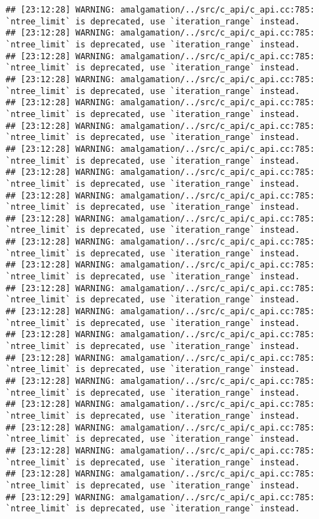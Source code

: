 \documentclass[
]{article}
\begin{document}
\begin{verbatim}
## [23:12:28] WARNING: amalgamation/../src/c_api/c_api.cc:785: `ntree_limit` is deprecated, use `iteration_range` instead.
## [23:12:28] WARNING: amalgamation/../src/c_api/c_api.cc:785: `ntree_limit` is deprecated, use `iteration_range` instead.
## [23:12:28] WARNING: amalgamation/../src/c_api/c_api.cc:785: `ntree_limit` is deprecated, use `iteration_range` instead.
## [23:12:28] WARNING: amalgamation/../src/c_api/c_api.cc:785: `ntree_limit` is deprecated, use `iteration_range` instead.
## [23:12:28] WARNING: amalgamation/../src/c_api/c_api.cc:785: `ntree_limit` is deprecated, use `iteration_range` instead.
## [23:12:28] WARNING: amalgamation/../src/c_api/c_api.cc:785: `ntree_limit` is deprecated, use `iteration_range` instead.
## [23:12:28] WARNING: amalgamation/../src/c_api/c_api.cc:785: `ntree_limit` is deprecated, use `iteration_range` instead.
## [23:12:28] WARNING: amalgamation/../src/c_api/c_api.cc:785: `ntree_limit` is deprecated, use `iteration_range` instead.
## [23:12:28] WARNING: amalgamation/../src/c_api/c_api.cc:785: `ntree_limit` is deprecated, use `iteration_range` instead.
## [23:12:28] WARNING: amalgamation/../src/c_api/c_api.cc:785: `ntree_limit` is deprecated, use `iteration_range` instead.
## [23:12:28] WARNING: amalgamation/../src/c_api/c_api.cc:785: `ntree_limit` is deprecated, use `iteration_range` instead.
## [23:12:28] WARNING: amalgamation/../src/c_api/c_api.cc:785: `ntree_limit` is deprecated, use `iteration_range` instead.
## [23:12:28] WARNING: amalgamation/../src/c_api/c_api.cc:785: `ntree_limit` is deprecated, use `iteration_range` instead.
## [23:12:28] WARNING: amalgamation/../src/c_api/c_api.cc:785: `ntree_limit` is deprecated, use `iteration_range` instead.
## [23:12:28] WARNING: amalgamation/../src/c_api/c_api.cc:785: `ntree_limit` is deprecated, use `iteration_range` instead.
## [23:12:28] WARNING: amalgamation/../src/c_api/c_api.cc:785: `ntree_limit` is deprecated, use `iteration_range` instead.
## [23:12:28] WARNING: amalgamation/../src/c_api/c_api.cc:785: `ntree_limit` is deprecated, use `iteration_range` instead.
## [23:12:28] WARNING: amalgamation/../src/c_api/c_api.cc:785: `ntree_limit` is deprecated, use `iteration_range` instead.
## [23:12:28] WARNING: amalgamation/../src/c_api/c_api.cc:785: `ntree_limit` is deprecated, use `iteration_range` instead.
## [23:12:28] WARNING: amalgamation/../src/c_api/c_api.cc:785: `ntree_limit` is deprecated, use `iteration_range` instead.
## [23:12:28] WARNING: amalgamation/../src/c_api/c_api.cc:785: `ntree_limit` is deprecated, use `iteration_range` instead.
## [23:12:29] WARNING: amalgamation/../src/c_api/c_api.cc:785: `ntree_limit` is deprecated, use `iteration_range` instead.

\end{verbatim}
\end{document}
